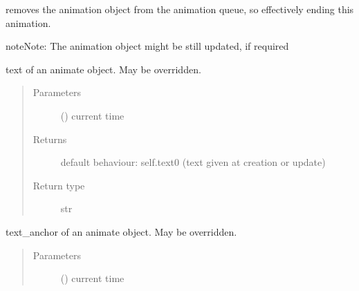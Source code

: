 \documentclass[letterpaper,10pt,english]{sphinxmanual}
\begin{document}
\begin{fulllineitems}
\begin{fulllineitems}
\end{fulllineitems}


\begin{fulllineitems}
\label{\detokenize{Reference:salabim.Animate.remove}}
removes the animation object from the animation queue,
so effectively ending this animation.

\begin{sphinxadmonition}{note}{Note:}
The animation object might be still updated, if required
\end{sphinxadmonition}

\end{fulllineitems}


\begin{fulllineitems}
\label{\detokenize{Reference:salabim.Animate.text}}
text of an animate object. May be overridden.
\begin{quote}\begin{description}
\item[{Parameters}] \leavevmode
{} () \textendash{} current time

\item[{Returns}] \leavevmode
{} \textendash{} default behaviour: self.text0 (text given at creation or update)

\item[{Return type}] \leavevmode
str

\end{description}\end{quote}

\end{fulllineitems}


\begin{fulllineitems}
\label{\detokenize{Reference:salabim.Animate.text_anchor}}
text\_anchor of an animate object. May be overridden.
\begin{quote}\begin{description}
\item[{Parameters}] \leavevmode
{} () \textendash{} current time


\end{description}
\end{quote}
\end{fulllineitems}
\end{fulllineitems}
\end{document}
